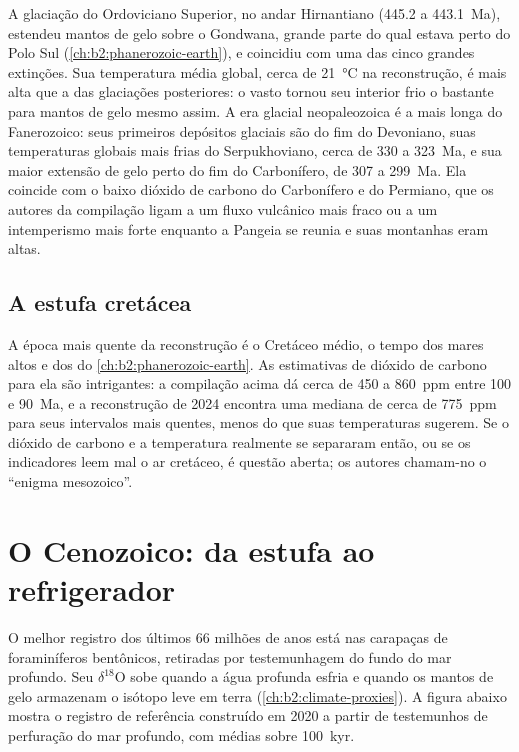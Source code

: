 A glaciação do Ordoviciano Superior, no andar Hirnantiano (445.2 a \qty{443.1}{Ma}), estendeu mantos de gelo
sobre o Gondwana, grande parte do qual estava perto do Polo Sul (\cref{ch:b2:phanerozoic-earth}), e
coincidiu com uma das cinco grandes extinções. Sua temperatura média global, cerca de
\qty{21}{\celsius} na reconstrução, é mais alta que a das glaciações posteriores: o vasto
 tornou seu interior frio o bastante para mantos de gelo mesmo assim. A era glacial neopaleozoica é
a mais longa do Fanerozoico: seus primeiros depósitos glaciais são do fim do Devoniano, suas temperaturas globais
mais frias do Serpukhoviano, cerca de 330 a \qty{323}{Ma}, e sua maior extensão
de gelo perto do fim do Carbonífero, de 307 a \qty{299}{Ma}. Ela coincide com o baixo dióxido de
carbono do Carbonífero e do Permiano, que os autores da compilação ligam a um fluxo vulcânico mais fraco
ou a um intemperismo mais forte enquanto a Pangeia se reunia e suas montanhas eram altas.

\subsection*{A estufa cretácea}

A época mais quente da reconstrução é o Cretáceo médio, o tempo dos mares altos e dos
 do \cref{ch:b2:phanerozoic-earth}. As estimativas de dióxido de carbono para
ela são intrigantes: a compilação acima dá cerca de 450 a \qty{860}{ppm} entre 100 e
\qty{90}{Ma}, e a reconstrução de 2024 encontra uma mediana de cerca de \qty{775}{ppm} para seus intervalos
mais quentes, menos do que suas temperaturas sugerem. Se o dióxido de carbono e a temperatura realmente se
separaram então, ou se os indicadores leem mal o ar cretáceo, é questão aberta; os autores chamam-no o ``enigma
mesozoico''.

\section{O Cenozoico: da estufa ao refrigerador}\label{sec:b2:deep-time-climate:cenozoic}

O melhor registro dos últimos 66 milhões de anos está nas carapaças de foraminíferos bentônicos, retiradas por
testemunhagem do fundo do mar profundo. Seu $\delta^{18}$O sobe quando a água profunda esfria e quando os mantos de gelo armazenam
o isótopo leve em terra (\cref{ch:b2:climate-proxies}). A figura abaixo mostra o registro de
referência construído em 2020 a partir de testemunhos de perfuração do mar profundo, com médias sobre \qty{100}{kyr}.

